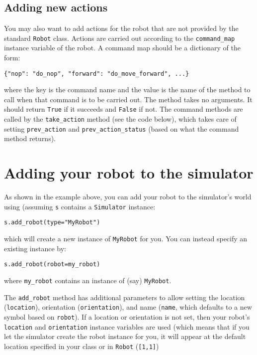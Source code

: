 \documentclass[11pt]{tufte-handout}
\begin{document}
\subsection{Adding new actions}
\label{sec:orgc1814be}

You may also want to add actions for the robot that are not provided by the standard \texttt{Robot} class.  Actions are carried out according to the \texttt{command\_map} instance variable of the robot.  A command map should be a dictionary of the form: 
\begin{verbatim}
{"nop": "do_nop", "forward": "do_move_forward", ...}
\end{verbatim}

\noindent where the key is the command name and the value is the name of the method to call when that command is to be carried out.  The method takes no arguments. It should return \texttt{True} if it succeeds and \texttt{False} if not.  The command methods are called by the \texttt{take\_action} method (see the code below), which takes care of setting \texttt{prev\_action} and \texttt{prev\_action\_status} (based on what the command method returns).

\section{Adding your robot to the simulator}
\label{sec:org2a74403}

As shown in the example above, you can add your robot to the simulator's world using (assuming \texttt{s} contains a \texttt{Simulator} instance:
\begin{verbatim}
s.add_robot(type="MyRobot")
\end{verbatim}

\noindent which will create a new instance of \texttt{MyRobot} for you.  You can instead specify an existing instance by:
\begin{verbatim}
s.add_robot(robot=my_robot)
\end{verbatim}

\noindent where \texttt{my\_robot} contains an instance of (say) \texttt{MyRobot}.

The \texttt{add\_robot} method has additional parameters to allow setting the location (\texttt{location}), orientation (\texttt{orientation}), and name (\texttt{name}, which defaults to a new symbol based on \texttt{robot}).  If a location or orientation is not set, then your robot's \texttt{location} and \texttt{orientation} instance variables are used (which means that if you let the simulator create the robot instance for you, it will appear at the default location specified in your class or in \texttt{Robot} (\texttt{[1,1]})
\end{document}

